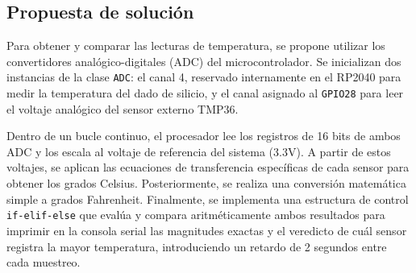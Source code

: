 \documentclass[letterpaper,12pt]{article}
\begin{document}
\begin{figure}[htbp]
    \end{figure}

    \subsection*{Propuesta de solución}

    Para obtener y comparar las lecturas de temperatura, se propone utilizar los convertidores analógico-digitales (ADC) del microcontrolador. Se inicializan dos instancias de la clase \texttt{ADC}: el canal 4, reservado internamente en el RP2040 para medir la temperatura del dado de silicio, y el canal asignado al \texttt{GPIO28} para leer el voltaje analógico del sensor externo TMP36. 
    
    Dentro de un bucle continuo, el procesador lee los registros de 16 bits de ambos ADC y los escala al voltaje de referencia del sistema (3.3V). A partir de estos voltajes, se aplican las ecuaciones de transferencia específicas de cada sensor para obtener los grados Celsius. Posteriormente, se realiza una conversión matemática simple a grados Fahrenheit. Finalmente, se implementa una estructura de control \texttt{if-elif-else} que evalúa y compara aritméticamente ambos resultados para imprimir en la consola serial las magnitudes exactas y el veredicto de cuál sensor registra la mayor temperatura, introduciendo un retardo de 2 segundos entre cada muestreo.
\end{document}
